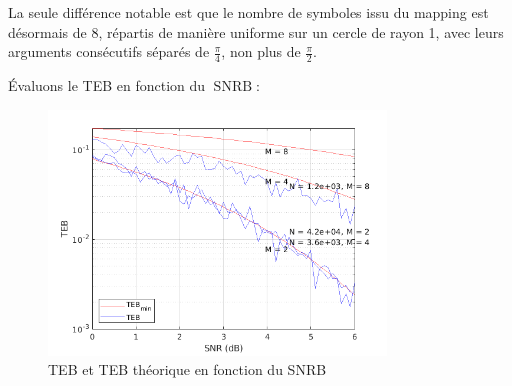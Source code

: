 \documentclass[a4paper, 12pt]{article}
\begin{document}
\vspace*{-1cm}
\begin{figure}[H]
\begin{adjustbox}{center}
\end{adjustbox}
\end{figure}

La seule différence notable est que le nombre de symboles issu du mapping est
désormais de 8, répartis de manière uniforme sur un cercle de rayon 1, avec leurs
arguments consécutifs séparés de $\frac{\pi}{4}$, non plus de $\frac{\pi}{2}$. \medbreak

Évaluons le TEB en fonction du $\operatorname{SNRB}$:

\begin{figure}[H]
    \centering
    \includegraphics[width=0.8\textwidth]{graphics/4-2.png}
    \caption{TEB et TEB théorique en fonction du SNRB}
    \label{fig:teb_snrb_dvbs2}
\end{figure}
\end{document}
